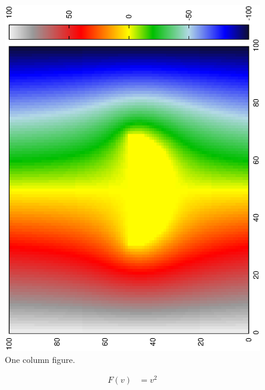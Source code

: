 \documentclass[aps,twocolumn,pre,nofootinbib]{revtex4-1}
\begin{document}

\begin{figure}
\includegraphics*[width=\breite \columnwidth]{circle.ps} 
\caption{One column figure.
}
\label{fig:Half}
\end{figure}
 
\begin{equation}
\begin{split}
F(v) &= v^2 
\end{split}
\label{Simple example}
\end{equation}


\end{document}

